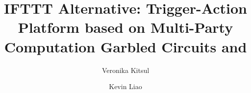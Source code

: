 \documentclass[sigplan,10pt]{acmart}
\begin{document}
\sloppy

\title{IFTTT Alternative: Trigger-Action Platform based on Multi-Party Computation Garbled Circuits and}
\author{Veronika Kitsul}
\author{Kevin Liao}



\maketitle






















\end{document}

